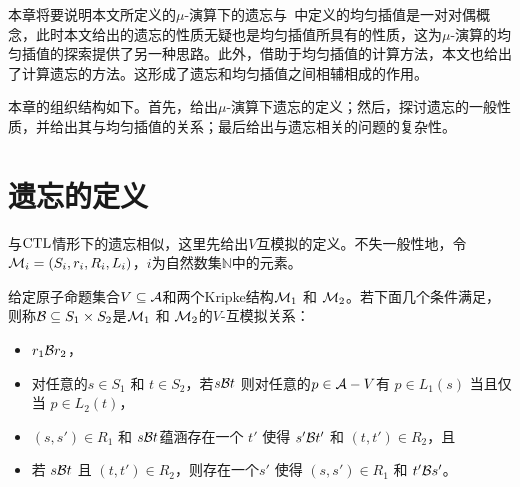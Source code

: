 本章将要说明本文所定义的$\mu$-演算下的遗忘与~\cite{d2006modal}中定义的均匀插值是一对对偶概念，此时本文给出的遗忘的性质无疑也是均匀插值所具有的性质，这为$\mu$-演算的均匀插值的探索提供了另一种思路。此外，借助于均匀插值的计算方法，本文也给出了计算遗忘的方法。这形成了遗忘和均匀插值之间相辅相成的作用。

本章的组织结构如下。首先，给出$\mu$-演算下遗忘的定义；然后，探讨遗忘的一般性质，并给出其与均匀插值的关系；最后给出与遗忘相关的问题的复杂性。

\section{遗忘的定义}\label{sec:chapter06-system-model}
与$\textrm{CTL}$情形下的遗忘相似，这里先给出$V$互模拟的定义。不失一般性地，令${\cal M}_i = (S_i, r_i, R_i, L_i)$，$i$为自然数集$\mathbb{N}$中的元素。
\begin{definition}[$V$-互模拟]\label{def:VB}
	给定原子命题集合$V \subseteq {\cal A}$和两个Kripke结构${\cal M}_1$ 和 ${\cal M}_2$。若下面几个条件满足，则称${\cal B}\subseteq S_1 \times S_2$是${\cal M}_1$ 和 ${\cal M}_2$的$V$-互模拟关系：
	\begin{itemize}
		\item $r_1 {\cal B} r_2$，
		\item 对任意的$s\in S_1$ 和 $t\in S_2$，若$s {\cal B} t$ 则对任意的$p \in {\cal A}- V$有 $p \in L_1(s)$ 当且仅当 $p \in L_2(t)$，
		\item $(s, s')\in R_1$ 和 $s {\cal B} t$蕴涵存在一个 $t'$ 使得 $s' {\cal B} t'$ 和 $(t, t')\in R_2$，且
		\item 若 $s {\cal B} t$ 且 $(t, t')\in R_2$，则存在一个$s'$ 使得 $(s, s')\in R_1$ 和 $t' {\cal B} s'$。
	\end{itemize}
\end{definition}

